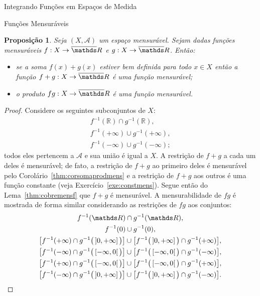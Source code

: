 \documentclass[oneside,final,11pt]{amsbook}
\newcommand{\R}{\mathds R}
\theoremstyle{remark}\newtheorem{exercise}{Exercício}[chapter]
\theoremstyle{remark}\newtheorem{*exercise}[exercise]{\hbox to 0pt{\hskip 0pt minus 1fil*}Exercício}
\theoremstyle{definition}\newtheorem{exdefin}{Definição}[chapter]
\theoremstyle{plain}\newtheorem{teo}{Teorema}[section]
\theoremstyle{plain}\newtheorem{lem}[teo]{Lema}
\theoremstyle{plain}\newtheorem{prop}[teo]{Proposição}
\theoremstyle{plain}\newtheorem{cor}[teo]{Corolário}
\theoremstyle{definition}\newtheorem{defin}[teo]{Definição}
\theoremstyle{remark}\newtheorem{rem}[teo]{Observação}
\theoremstyle{definition}\newtheorem{notation}[teo]{Notação}
\theoremstyle{definition}\newtheorem{convention}[teo]{Convenção}
\theoremstyle{definition}\newtheorem{example}[teo]{Exemplo}
\numberwithin{section}{chapter}
\numberwithin{equation}{section}
\begin{document}
\begin{chapter}{Integrando Funções em Espaços de Medida}
\begin{section}{Funções Mensuráveis}
\begin{prop}\label{thm:somaprodmensRest}
Seja $(X,\mathcal A)$ um espaço mensurável. Sejam dadas funções mensuráveis
$f:X\to\overline\R$ e $g:X\to\overline\R$. Então:
\begin{itemize}
\item se a soma $f(x)+g(x)$ estiver bem definida para todo $x\in X$ então a função
$f+g:X\to\overline\R$ é uma função mensurável;
\item o produto $fg:X\to\overline\R$ é uma função mensurável.
\end{itemize}
\end{prop}
\begin{proof}
Considere os seguintes subconjuntos de $X$:
\begin{gather*}
f^{-1}(\R)\cap g^{-1}(\R),\\
f^{-1}(+\infty)\cup g^{-1}(+\infty),\\
f^{-1}(-\infty)\cup g^{-1}(-\infty);
\end{gather*}
todos eles pertencem a $\mathcal A$ e sua união é igual a $X$. A restrição de $f+g$ a cada um
deles é mensurável; de fato, a restrição de $f+g$ ao primeiro deles é mensurável pelo Corolário~\ref{thm:corsomaprodmens}
e a restrição de $f+g$ aos outros é uma função constante (veja Exercício~\ref{exe:constmens}). Segue então do Lema~\ref{thm:cobremensf}
que $f+g$ é mensurável. A mensurabilidade de $fg$ é mostrada de forma similar considerando
as restrições de $fg$ aos conjuntos:
\begin{gather*}
f^{-1}(\R)\cap g^{-1}(\R),\\
f^{-1}(0)\cup g^{-1}(0),\\
\big[f^{-1}(+\infty)\cap g^{-1}\big(\left]0,+\infty\right]\big)\big]\cup
\big[f^{-1}\big(\left]0,+\infty\right]\big)\cap g^{-1}(+\infty)\big],\\
\big[f^{-1}(-\infty)\cap g^{-1}\big(\left[-\infty,0\right[\big)\big]\cup
\big[f^{-1}\big(\left[-\infty,0\right[\big)\cap g^{-1}(-\infty)\big],\\
\big[f^{-1}(+\infty)\cap g^{-1}\big(\left[-\infty,0\right[\big)\big]\cup
\big[f^{-1}\big(\left[-\infty,0\right[\big)\cap g^{-1}(+\infty)\big],\\
\big[f^{-1}(-\infty)\cap g^{-1}\big(\left]0,+\infty\right]\big)\big]\cup
\big[f^{-1}\big(\left]0,+\infty\right]\big)\cap g^{-1}(-\infty)\big].\qedhere
\end{gather*}
\end{proof}


\end{section}
\end{chapter}
\end{document}

